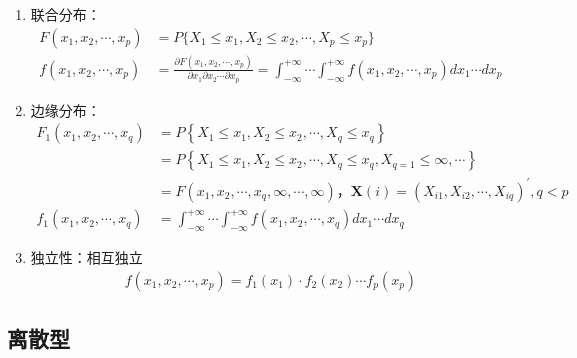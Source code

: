 \documentclass[12pt]{book}
\begin{document}
\begin{enumerate}[1.]
    \item 联合分布：
          \begin{align*}
              F(x_1,x_2,\cdots,x_p)
              &= P\{X_1\leqslant x_1,X_2\leqslant x_2,\cdots,X_p\leqslant x_p \} \\
              f\left(x_1,x_2,\cdots,x_p\right)
              &=\frac{\partial F\left(x_1,x_2,\cdots,x_p\right)}{\partial x_1\partial x_2\cdots\partial x_p}
              =\int_{-\infty}^{+\infty}{\cdots\int_{-\infty}^{+\infty}{f\left(x_1,x_2,\cdots,x_p\right)dx_1\cdots d x_p}}
          \end{align*}
    \item 边缘分布：
          \begin{align*}
              F_1\left(x_1,x_2,\cdots,x_q\right)
              &=P\left\{X_1\le x_1,X_2\le x_2,\cdots,X_q\le x_q\right\} \\
              &=P\left\{X_1\le x_1,X_2\le x_2,\cdots,X_q\le x_q,X_{q=1}\le\infty,\cdots\right\} \\
              &=F(x_1,x_2,\cdots,x_q,\infty,\cdots,\infty)，
              \bm{X}(i)=(X_{i1},X_{i2},\cdots,X_{iq})^\prime,q<p  \\
              f_1\left(x_1,x_2,\cdots,x_q\right)&=\int_{-\infty}^{+\infty}{\cdots\int_{-\infty}^{+\infty}{f\left(x_1,x_2,\cdots,x_q\right)dx_1\cdots d x_q}}
          \end{align*}
    \item 独立性：相互独立
    \begin{gather*}
              f(x_1,x_2,\cdots,x_p)
              = f_1(x_1)\cdot f_{2}(x_2)\cdots f_{p}(x_p)
          \end{gather*}
\end{enumerate}


\subsection{离散型}
\end{document}
